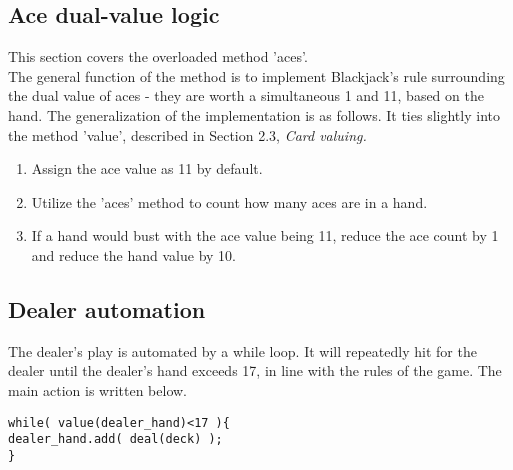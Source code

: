 \documentclass[english]{article}
\begin{document}
\subsection{Ace dual-value logic}
This section covers the overloaded method 'aces'. \\
The general function of the method is to implement Blackjack's rule surrounding the dual value of aces - they are worth a simultaneous 1 and 11, based on the hand. The generalization of the implementation is as follows. It ties slightly into the method 'value', described in Section 2.3, \textit{Card valuing.} 
\begin{enumerate}
	\item Assign the ace value as 11 by default.
	\item Utilize the 'aces' method to count how many aces are in a hand. 
	\item If a hand would bust with the ace value being 11, reduce the ace count by 1 and reduce the hand value by 10.
\end{enumerate}

\subsection{Dealer automation}
The dealer's play is automated by a while loop. It will repeatedly hit for the dealer until the dealer's hand exceeds 17, in line with the rules of the game. The main action is written below.
\begin{verbatim}     
while( value(dealer_hand)<17 ){
dealer_hand.add( deal(deck) ); 
}
\end{verbatim}
\end{document}
